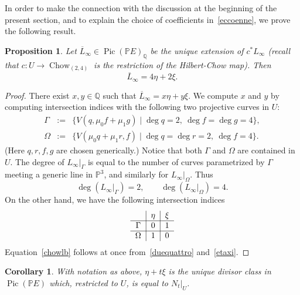 \documentclass[11pt]{amsart}
\numberwithin{equation}{section}
\theoremstyle{plain}
\newtheorem{proposition}[theorem]{Proposition}
\newtheorem{corollary}[theorem]{Corollary}
\theoremstyle{remark}
\theoremstyle{definition}
\def\Pic{\operatorname{Pic}}
\newcommand{\ov}{\overline}
\newcommand{\PP}{{\mathbb P}}
\newcommand{\QQ}{{\mathbb Q}}
\DeclareMathOperator{\Chow}{Chow}
\begin{document}
In order to make the connection with the discussion at the beginning of the present section,  and to explain the choice of coefficients in~\eqref{eccoenne}, we prove the following result.
%
\begin{proposition}\label{prp:chowlb}
%
Let $\ov{L}_{\infty}\in\Pic(\PP E)_{\QQ}$ be the unique extension of $c^{*}L_{\infty}$ (recall that $c\colon U\to \Chow_{(2,4)}$ 
is the restriction of the Hilbert-Chow map). Then 
%
\begin{equation}\label{chowlb}
%
\ov{L}_{\infty}=4\eta+2\xi.
%
\end{equation}
%
\end{proposition}
%
\begin{proof}
%
There exist $x,y\in\QQ$ such that $\ov{L}_{\infty}=x\eta+y\xi$. We compute $x$ and $y$ by computing intersection indices with the following two projective curves in $U$:
%
\begin{eqnarray}
%
\Gamma & := & \{V(q, \mu_0 f +\mu_1 g)\mid \deg q=2,\ \deg f=\deg g=4\}, \label{curvagam} \\
% 
\Omega & := & \{V( \mu_0 q +\mu_1 r, f)\mid \deg q=\deg r=2,\ \deg f=4\}. \label{curvaom}
%
\end{eqnarray}
%
(Here $q,r,f,g$ are chosen generically.) Notice that both $\Gamma$ and $\Omega$ are contained in $U$. The degree of $L_{\infty}|_{\Gamma}$ is equal to the number of curves parametrized by $\Gamma$ meeting a generic line in $\PP^3$, and similarly for $L_{\infty}|_{\Omega}$. 
Thus
%
\begin{equation}\label{duequattro}
%
\deg(L_{\infty}|_{\Gamma})=2,\qquad \deg\left(L_{\infty}|_{\Omega}\right)=4.
%
\end{equation}
%
On the other hand, we have the following intersection indices 
\begin{equation}\label{etaxi}
%
\begin{tabular}{c|c|c }
 &  $\eta$ & $\xi$  \\
\hline
$\Gamma$  & $0$ & $1$  \\
\hline
%
$\Omega$  & $1$ & $0$
%   
\end{tabular}
%
\end{equation}
%
Equation~\eqref{chowlb} follows at once from~\eqref{duequattro} and~\eqref{etaxi}.
%
\end{proof}
%
%
\begin{corollary}\label{crl:chowlb}
%
With notation as above,  $\eta+t\xi$ is the unique divisor class in $\Pic(\PP E)$ which, restricted to $U$, is equal to  $N_t|_U$. 
%
\end{corollary}
\end{document}
